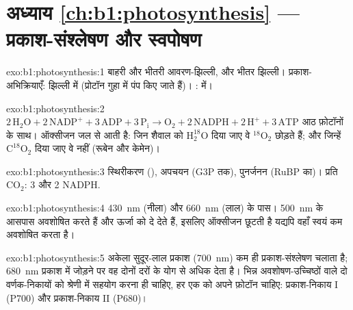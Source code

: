 \section*{अध्याय \ref{ch:b1:photosynthesis} --- प्रकाश-संश्लेषण और स्वपोषण}

\begin{solution}{exo:b1:photosynthesis:1}
बाहरी और भीतरी आवरण-झिल्ली, और भीतर  झिल्ली।
प्रकाश-अभिक्रियाएँ:  झिल्ली में (प्रोटॉन गुहा में पंप किए जाते
हैं)। :  में।
\end{solution}

\begin{solution}{exo:b1:photosynthesis:2}
$2\,\mathrm{H_2O} + 2\,\mathrm{NADP^+} + 3\,\mathrm{ADP} + 3\,\mathrm{P_i}
\to \mathrm{O_2} + 2\,\mathrm{NADPH} + 2\,\mathrm{H^+} + 3\,\mathrm{ATP}$
आठ फ़ोटॉनों के साथ। ऑक्सीजन जल से आती है: जिन शैवाल को
$\mathrm{H_2^{18}O}$ दिया जाए वे $\mathrm{^{18}O_2}$ छोड़ते हैं; और जिन्हें
$\mathrm{C^{18}O_2}$ दिया जाए वे नहीं (रूबेन और केमेन)।
\end{solution}

\begin{solution}{exo:b1:photosynthesis:3}
स्थिरीकरण (), अपचयन (G3P तक), पुनर्जनन (RuBP का)। प्रति
$\mathrm{CO_2}$: 3  और 2 NADPH.
\end{solution}

\begin{solution}{exo:b1:photosynthesis:4}
\qty{430}{nm} (नीला) और \qty{660}{nm} (लाल) के पास। \qty{500}{nm} के
आसपास  अवशोषित करते हैं और ऊर्जा  को दे देते हैं, इसलिए
ऑक्सीजन छूटती है यद्यपि वहाँ  स्वयं कम अवशोषित करता है।
\end{solution}

\begin{solution}{exo:b1:photosynthesis:5}
अकेला सुदूर-लाल प्रकाश (\qty{700}{nm}) कम ही प्रकाश-संश्लेषण चलाता है;
\qty{680}{nm} प्रकाश में जोड़ने पर वह दोनों दरों के योग से अधिक देता है।
भिन्न अवशोषण-उच्चिष्ठों वाले दो वर्णक-निकायों को श्रेणी में सहयोग करना ही
चाहिए, हर एक को अपने फ़ोटॉन चाहिए: प्रकाश-निकाय I (P700) और
प्रकाश-निकाय II (P680)।
\end{solution}


